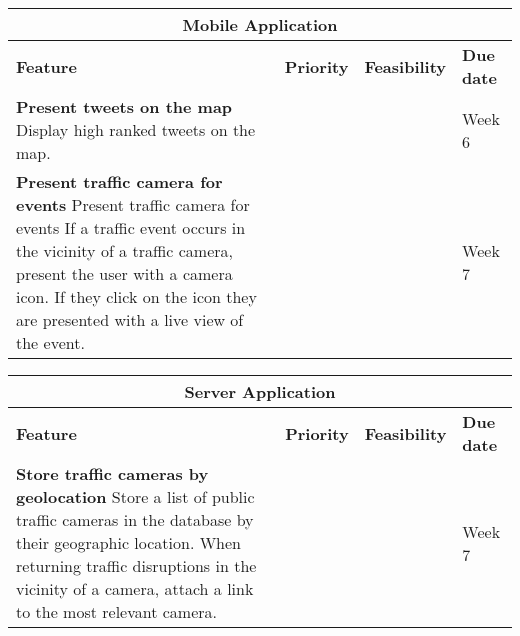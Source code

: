 \begin{center}
\begin{tabular}{ | p{9cm} | c | c | p{1.8cm} | }
\hline
\multicolumn{4}{|c|}{\textbf{Mobile Application}} \\ \hline
\textbf{Feature} & \textbf{Priority} & \textbf{Feasibility} & \textbf{Due date}
\\ \hline
\textbf{Present tweets on the map}\newline
Display high ranked tweets on the map. & & & Week 6 \\ \hline
\textbf{Present traffic camera for events}\newline
Present traffic camera for events
If a traffic event occurs in the vicinity of a traffic camera, present the user
with a camera icon. If they click on the icon they are presented with a live
view of the event. &  &  & Week 7 \\ \hline
\end{tabular}
\end{center}

\begin{center}
\begin{tabular}{ | p{9cm} | c | c | p{1.8cm} | }
\hline
\multicolumn{4}{|c|}{\textbf{Server Application}} \\ \hline
\textbf{Feature} & \textbf{Priority} & \textbf{Feasibility} & \textbf{Due date}
\\ \hline
\textbf{Store traffic cameras by geolocation}\newline
Store a list of public traffic cameras in the database by their geographic
location. When returning traffic disruptions in the vicinity of a camera,
attach a link to the most relevant camera. &  &  & Week 7 \\ \hline
\end{tabular}
\end{center}
